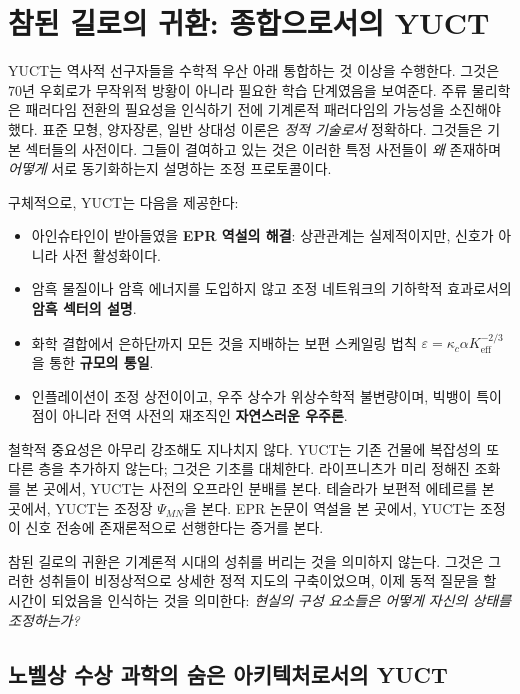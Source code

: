 \documentclass[12pt,a4paper]{article}
\begin{document}
	\section{참된 길로의 귀환: 종합으로서의 YUCT}
	
	YUCT는 역사적 선구자들을 수학적 우산 아래 통합하는 것 이상을 수행한다. 그것은 70년 우회로가 무작위적 방황이 아니라 필요한 학습 단계였음을 보여준다. 주류 물리학은 패러다임 전환의 필요성을 인식하기 전에 기계론적 패러다임의 가능성을 소진해야 했다. 표준 모형, 양자장론, 일반 상대성 이론은 \emph{정적 기술로서} 정확하다. 그것들은 기본 섹터들의 사전이다. 그들이 결여하고 있는 것은 이러한 특정 사전들이 \emph{왜} 존재하며 \emph{어떻게} 서로 동기화하는지 설명하는 조정 프로토콜이다.
	
	구체적으로, YUCT는 다음을 제공한다:
	\begin{itemize}
		\item 아인슈타인이 받아들였을 \textbf{EPR 역설의 해결}: 상관관계는 실제적이지만, 신호가 아니라 사전 활성화이다.
		\item 암흑 물질이나 암흑 에너지를 도입하지 않고 조정 네트워크의 기하학적 효과로서의 \textbf{암흑 섹터의 설명}.
		\item 화학 결합에서 은하단까지 모든 것을 지배하는 보편 스케일링 법칙 \(\varepsilon = \kappa_c \alpha K_{\mathrm{eff}}^{-2/3}\)을 통한 \textbf{규모의 통일}.
		\item 인플레이션이 조정 상전이이고, 우주 상수가 위상수학적 불변량이며, 빅뱅이 특이점이 아니라 전역 사전의 재조직인 \textbf{자연스러운 우주론}.
	\end{itemize}
	
	철학적 중요성은 아무리 강조해도 지나치지 않다. YUCT는 기존 건물에 복잡성의 또 다른 층을 추가하지 않는다; 그것은 기초를 대체한다. 라이프니츠가 미리 정해진 조화를 본 곳에서, YUCT는 사전의 오프라인 분배를 본다. 테슬라가 보편적 에테르를 본 곳에서, YUCT는 조정장 \(\Psi_{MN}\)을 본다. EPR 논문이 역설을 본 곳에서, YUCT는 조정이 신호 전송에 존재론적으로 선행한다는 증거를 본다.
	
	참된 길로의 귀환은 기계론적 시대의 성취를 버리는 것을 의미하지 않는다. 그것은 그러한 성취들이 비정상적으로 상세한 정적 지도의 구축이었으며, 이제 동적 질문을 할 시간이 되었음을 인식하는 것을 의미한다: \emph{현실의 구성 요소들은 어떻게 자신의 상태를 조정하는가?}
	
	\subsection{노벨상 수상 과학의 숨은 아키텍처로서의 YUCT}
	
\end{document}
